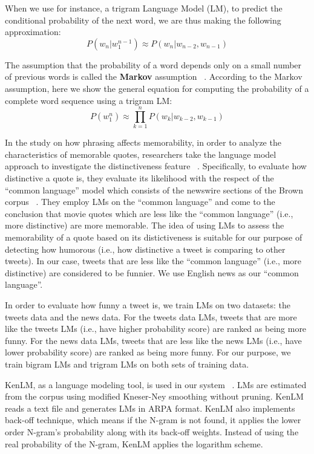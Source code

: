 \documentclass[11pt,a4paper]{article}
\begin{document}
When we use for instance, a trigram Language Model (LM), to predict the conditional probability of the next word, we are thus making the following approximation:
\begin{equation}
P(w_n|w_1^{n-1})\approx P(w_n|w_{n-2}, w_{n-1})
\end{equation}

The assumption that the probability of a word depends only on a small number of previous words is called the \textbf{Markov} assumption ~\cite{markov1954theory}. According to the Markov assumption, here we show the general equation for computing the probability of a complete word sequence using a trigram LM:
\begin{equation}
P(w_1^n)\approx \prod_{k=1}^{n} P(w_k|w_{k-2}, w_{k-1})
\end{equation}
 
In the study on how phrasing affects memorability, in order to analyze the characteristics of memorable quotes, researchers take the language model approach to investigate the distinctiveness feature ~\cite{hello}. Specifically, to evaluate how distinctive a quote is, they evaluate its likelihood with the respect of the ``common language'' model which consists of the newswire sections of the Brown corpus ~\cite{BC}. They employ LMs on the ``common language'' and come to the conclusion that movie quotes which are less like the ``common language'' (i.e., more distinctive) are more memorable. The idea of using LMs to assess the memorability of a quote based on its distictiveness is suitable for our purpose of detecting how humorous (i.e., how distinctive a tweet is comparing to other tweets). In our case, tweets that are less like the ``common language'' (i.e., more distinctive) are considered to be funnier. We use English news as our ``common language''.

In order to evaluate how funny a tweet is, we train LMs on two datasets: the tweets data and the news data. For the tweets data LMs, tweets that are more like the tweets LMs (i.e., have higher probability score) are ranked as being more funny. For the news data LMs, tweets that are less like the news LMs (i.e., have lower probability score) are ranked as being more funny. For our purpose, we train bigram LMs and trigram LMs on both sets of training data.

KenLM, as a language modeling tool, is used in our system ~\cite{Heafield-estimate}. LMs are estimated from the corpus using modified Kneser-Ney smoothing without pruning. KenLM reads a text file and generates LMs in ARPA format. KenLM also implements back-off technique, which means if the N-gram is not found, it applies the lower order N-gram's probability along with its back-off weights. Instead of using the real probability of the N-gram, KenLM applies the logarithm scheme.
\end{document}
